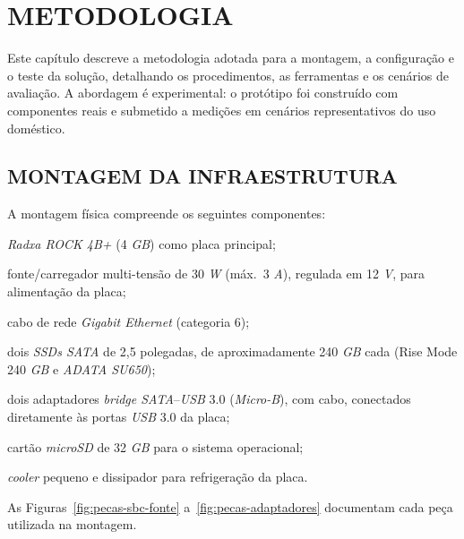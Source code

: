 
\chapter{METODOLOGIA}
\label{cap:metodologia}

Este capítulo descreve a metodologia adotada para a montagem, a configuração e o teste da solução, detalhando os procedimentos, as ferramentas e os cenários de avaliação. A abordagem é experimental: o protótipo foi construído com componentes reais e submetido a medições em cenários representativos do uso doméstico.

\section{MONTAGEM DA INFRAESTRUTURA}

A montagem física compreende os seguintes componentes:
\begin{alineas}
    \item \textit{Radxa ROCK 4B+} (4 \textit{GB}) como placa principal;
    \item fonte/carregador multi-tensão de 30 \textit{W} (máx.\ 3 \textit{A}), regulada em 12 \textit{V}, para alimentação da placa;
    \item cabo de rede \textit{Gigabit Ethernet} (categoria 6);
    \item dois \textit{SSDs SATA} de 2,5 polegadas, de aproximadamente 240 \textit{GB} cada (Rise Mode 240 \textit{GB} e \textit{ADATA SU650});
    \item dois adaptadores \textit{bridge SATA}--\textit{USB} 3.0 (\textit{Micro-B}), com cabo, conectados diretamente às portas \textit{USB} 3.0 da placa;
    \item cartão \textit{microSD} de 32 \textit{GB} para o sistema operacional;
    \item \textit{cooler} pequeno e dissipador para refrigeração da placa.
\end{alineas}

As Figuras~\ref{fig:pecas-sbc-fonte} a~\ref{fig:pecas-adaptadores} documentam cada peça utilizada na montagem.

\begin{figure}[H]
    \centering
    \hfill
    \fonteautoria
\end{figure}

